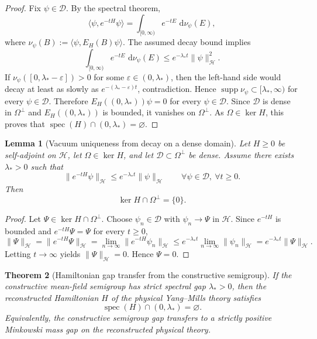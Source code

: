 \documentclass[11pt]{article}
\newtheorem{theorem}{Theorem}[section]
\newtheorem{lemma}[theorem]{Lemma}
\theoremstyle{definition}
\theoremstyle{remark}
\newcommand{\mcH}{\mathcal H}
\newcommand{\dd}{\,\mathrm d}
\newcommand{\spec}{\operatorname{spec}}
\newcommand{\supp}{\operatorname{supp}}
\begin{document}
\begin{proof}
Fix \(\psi\in\mathcal D\).  By the spectral theorem,
\[
\langle \psi,e^{-tH}\psi\rangle
=
\int_{[0,\infty)} e^{-tE}\,\dd\nu_\psi(E),
\]
where \(\nu_\psi(B):=\langle \psi,E_H(B)\psi\rangle\).  The assumed decay bound
implies
\[
\int_{[0,\infty)} e^{-tE}\,\dd\nu_\psi(E)
\le
e^{-\lambda_* t}\|\psi\|_{\mcH}^2.
\]
If \(\nu_\psi([0,\lambda_*-\varepsilon])>0\) for some
\(\varepsilon\in(0,\lambda_*)\), then the left-hand side would decay at least
as slowly as \(e^{-(\lambda_*-\varepsilon)t}\), contradiction.  Hence
\(\supp\nu_\psi\subset[\lambda_*,\infty)\) for every \(\psi\in\mathcal D\).
Therefore \(E_H((0,\lambda_*))\psi=0\) for every \(\psi\in\mathcal D\).  Since
\(\mathcal D\) is dense in \(\Omega^\perp\) and \(E_H((0,\lambda_*))\) is
bounded, it vanishes on \(\Omega^\perp\).  As \(\Omega\in\ker H\), this proves
that \(\spec(H)\cap(0,\lambda_*)=\varnothing\).
\end{proof}

\begin{lemma}[Vacuum uniqueness from decay on a dense domain]
\label{lem:vacuum-uniqueness-from-decay}
Let \(H\ge0\) be self-adjoint on \(\mcH\), let \(\Omega\in\ker H\), and let
\(\mathcal D\subset\Omega^\perp\) be dense.  Assume there exists
\(\lambda_*>0\) such that
\[
\|e^{-tH}\psi\|_{\mcH}\le e^{-\lambda_* t}\|\psi\|_{\mcH}
\qquad
\forall \psi\in\mathcal D,\ \forall t\ge0.
\]
Then
\[
\ker H\cap\Omega^\perp=\{0\}.
\]
\end{lemma}

\begin{proof}
Let \(\Psi\in\ker H\cap\Omega^\perp\).  Choose \(\psi_n\in\mathcal D\) with
\(\psi_n\to\Psi\) in \(\mcH\).  Since \(e^{-tH}\) is bounded and
\(e^{-tH}\Psi=\Psi\) for every \(t\ge0\),
\[
\|\Psi\|_{\mcH}
=
\|e^{-tH}\Psi\|_{\mcH}
=
\lim_{n\to\infty}\|e^{-tH}\psi_n\|_{\mcH}
\le
e^{-\lambda_* t}\lim_{n\to\infty}\|\psi_n\|_{\mcH}
=
e^{-\lambda_* t}\|\Psi\|_{\mcH}.
\]
Letting \(t\to\infty\) yields \(\|\Psi\|_{\mcH}=0\).  Hence \(\Psi=0\).
\end{proof}

\begin{theorem}[Hamiltonian gap transfer from the constructive semigroup]
\label{thm:hamiltonian-gap-transfer}
If the constructive mean-field semigroup has strict spectral gap
\(\lambda_*>0\), then the reconstructed Hamiltonian \(H\) of the physical
Yang--Mills theory satisfies
\[
\spec(H)\cap(0,\lambda_*)=\varnothing.
\]
Equivalently, the constructive semigroup gap transfers to a strictly positive
Minkowski mass gap on the reconstructed physical theory.
\end{theorem}
\end{document}
